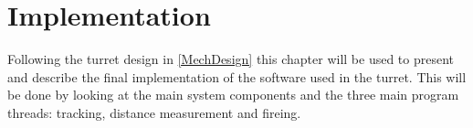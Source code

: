 \chapter{Implementation}\label{ImplLabel}
Following the turret design in \autoref{MechDesign} this chapter will be used to present and
describe the final implementation of the software used in the \name turret. This will be done
by looking at the main system components and the three main program threads:
tracking, distance measurement and fireing.


%






% 
